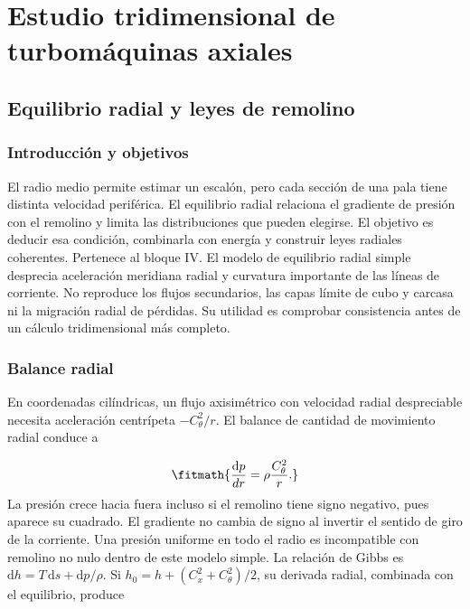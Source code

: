 \documentclass[10pt,openany]{book}
\begin{document}
\studiumchaptercheck

\part{Estudio tridimensional de turbomáquinas axiales}

\chapter{Equilibrio radial y leyes de remolino}
\label{chap:c11}


\section{Introducción y objetivos}

El radio medio permite estimar un escalón, pero cada sección de una pala tiene distinta velocidad periférica. El equilibrio radial relaciona el gradiente de presión con el remolino y limita las distribuciones que pueden elegirse. El objetivo es deducir esa condición, combinarla con energía y construir leyes radiales coherentes. Pertenece al bloque IV.
El modelo de equilibrio radial simple desprecia aceleración meridiana radial y curvatura importante de las líneas de corriente. No reproduce los flujos secundarios, las capas límite de cubo y carcasa ni la migración radial de pérdidas. Su utilidad es comprobar consistencia antes de un cálculo tridimensional más completo.

\section{Balance radial}

En coordenadas cilíndricas, un flujo axisimétrico con velocidad radial despreciable necesita aceleración centrípeta \(-C_\theta^2/r\). El balance de cantidad de movimiento radial conduce a

\[
\fitmath{\frac{\mathrm{d}p}{dr}=\rho\frac{C_\theta^2}{r}.}
\]
La presión crece hacia fuera incluso si el remolino tiene signo negativo, pues aparece su cuadrado. El gradiente no cambia de signo al invertir el sentido de giro de la corriente. Una presión uniforme en todo el radio es incompatible con remolino no nulo dentro de este modelo simple.
La relación de Gibbs es \(\mathrm{d}h=T\,\mathrm{d}s+\mathrm{d}p/\rho\). Si \(h_0=h+(C_x^2+C_\theta^2)/2\), su derivada radial, combinada con el equilibrio, produce
\end{document}
